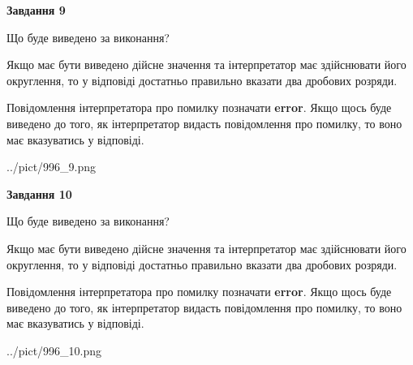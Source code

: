 \documentclass[12pt, ukrainian]{article}
\begin{document}
{\begin {Large}
{\begin {center}\textbf{Завдання 9}\end {center}}\par
Що буде виведено за виконання? \par

Якщо має бути виведено дійсне значення та інтерпретатор має здійснювати його округлення, 
то у відповіді достатньо правильно вказати два дробових розряди.

Повідомлення інтерпретатора про помилку позначати \textbf{error}.
Якщо щось буде виведено до того, як інтерпретатор видасть повідомлення про помилку, 
то воно має вказуватись у відповіді. \par

\begin{center}
	{../pict/996_9.png}
\end{center}
\newpage

{\begin {center}\textbf{Завдання 10}\end {center}}\par
Що буде виведено за виконання? \par

Якщо має бути виведено дійсне значення та інтерпретатор має здійснювати його округлення, 
то у відповіді достатньо правильно вказати два дробових розряди.

Повідомлення інтерпретатора про помилку позначати \textbf{error}.
Якщо щось буде виведено до того, як інтерпретатор видасть повідомлення про помилку, 
то воно має вказуватись у відповіді. \par

\begin{center}
	{../pict/996_10.png}
\end{center}
\newpage

\end {Large}}
\end{document}
